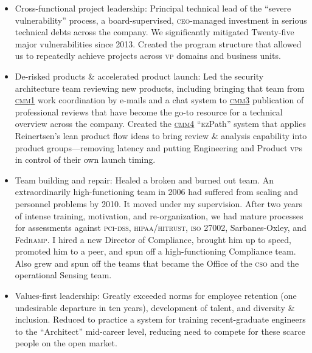 \documentclass[letterpaper]{article}
\newcommand{\cmm}[1]{\href{https://en.wikipedia.org/wiki/Capability_Maturity_Model}{\textsc{cmm}#1}}
\begin{document}
  \begin{itemize}
  \item Cross-functional project leadership: Principal technical lead
    of the ``severe vulnerability'' process, a board-supervised,
    \textsc{ceo}-managed investment in serious technical debts across
    the company.  We significantly mitigated Twenty-five major
    vulnerabilities since 2013.  Created the program structure that
    allowed us to repeatedly achieve projects across \textsc{vp}
    domains and business units.
  \item De-risked products \& accelerated product launch: Led the
    security architecture team reviewing new products, including
    bringing that team from \cmm{1} work coordination by e-mails and a
    chat system to \cmm{3} publication of professional reviews that
    have become the go-to resource for a technical overview across the
    company.  Created the \cmm{4} ``\textsc{ez}Path'' system that
    applies Reinertsen's lean product flow ideas to bring review \&
    analysis capability into product groups---removing latency and
    putting Engineering and Product \textsc{vp}s in control of their
    own launch timing.
  \item Team building and repair: Healed a broken and burned out team.
    An extraordinarily high-functioning team in 2006 had suffered from
    scaling and personnel problems by 2010.  It moved under my
    supervision.  After two years of intense training, motivation, and
    re-organization, we had mature processes for assessments against
    \textsc{pci-dss, hipaa/hitrust, iso 27002}, Sarbanes-Oxley, and
    Fed\textsc{ramp}.  I hired a new Director of Compliance, brought
    him up to speed, promoted him to a peer, and spun off a
    high-functioning Compliance team.  Also grew and spun off the
    teams that became the Office of the \textsc{cso} and the operational
    Sensing team.
  \item Values-first leadership: Greatly exceeded norms for employee
    retention (one undesirable departure in ten years), development of
    talent, and diversity \& inclusion.  Reduced to practice a system
    for training recent-graduate engineers to the ``Architect''
    mid-career level, reducing need to compete for these scarce people
    on the open market.
  \end{itemize}
\end{document}
